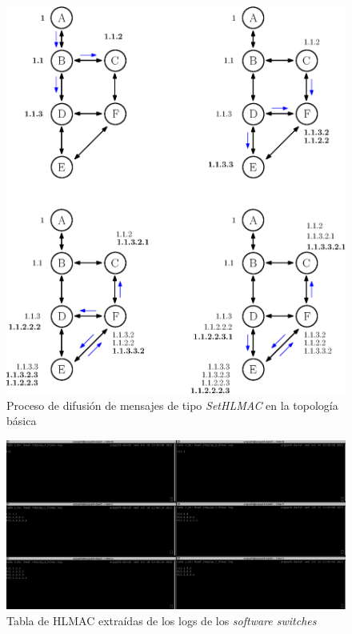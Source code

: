 \newpage
\begin{figure}[ht]
    \centering
    \includegraphics[width=\textwidth]{archivos/img/dev/topo_sethlmac.eps}
    \caption{Proceso de difusión de mensajes de tipo \textit{SetHLMAC} en la topología básica}
    \label{fig:topo_sethlmac}
\end{figure}
\newpage
\begin{figure}
    \begin{center}
        \includegraphics[width=\textwidth]{archivos/img/dev/hlmac_real.png}
        \caption{Tabla de HLMAC extraídas de los logs de los \textit{software switches}}
        \label{fig:hlmac_real}
    \end{center}
\end{figure}
